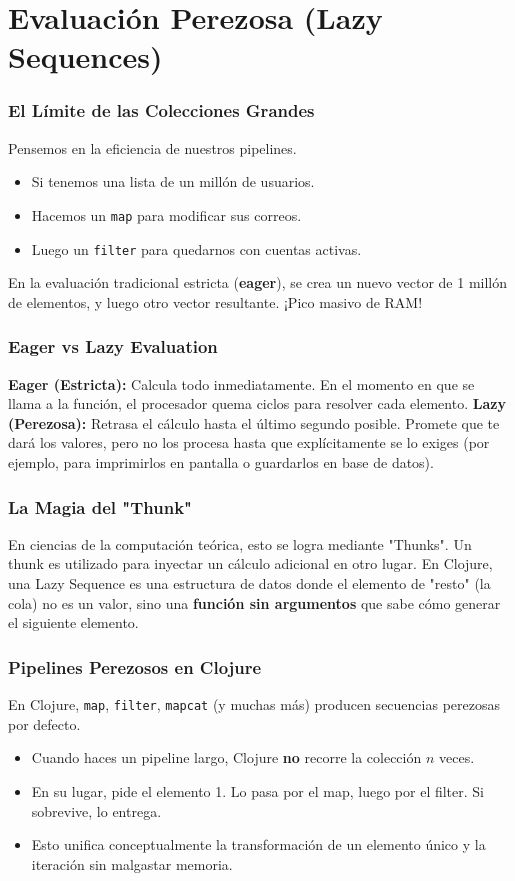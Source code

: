 \documentclass{beamer}
\begin{document}
\section{Evaluación Perezosa (Lazy Sequences)}

\begin{frame}
    \frametitle{El Límite de las Colecciones Grandes}
    Pensemos en la eficiencia de nuestros pipelines.
    \begin{itemize}
        \item Si tenemos una lista de un millón de usuarios.
        \item Hacemos un \texttt{map} para modificar sus correos.
        \item Luego un \texttt{filter} para quedarnos con cuentas activas.
    \end{itemize}
    En la evaluación tradicional estricta (\textbf{eager}), se crea un nuevo vector de 1 millón de elementos, y luego otro vector resultante. ¡Pico masivo de RAM!
\end{frame}

\begin{frame}
    \frametitle{Eager vs Lazy Evaluation}
    \textbf{Eager (Estricta):} Calcula todo inmediatamente. En el momento en que se llama a la función, el procesador quema ciclos para resolver cada elemento.
    \vspace{0.5cm}
    \textbf{Lazy (Perezosa):} Retrasa el cálculo hasta el último segundo posible. Promete que te dará los valores, pero no los procesa hasta que explícitamente se lo exiges (por ejemplo, para imprimirlos en pantalla o guardarlos en base de datos).
\end{frame}

\begin{frame}
    \frametitle{La Magia del "Thunk"}
    En ciencias de la computación teórica, esto se logra mediante "Thunks".
    Un thunk es utilizado para inyectar un cálculo adicional en otro lugar. En Clojure, una Lazy Sequence es una estructura de datos donde el elemento de "resto" (la cola) no es un valor, sino una \textbf{función sin argumentos} que sabe cómo generar el siguiente elemento.
\end{frame}

\begin{frame}
    \frametitle{Pipelines Perezosos en Clojure}
    En Clojure, \texttt{map}, \texttt{filter}, \texttt{mapcat} (y muchas más) producen secuencias perezosas por defecto.
    \begin{itemize}
        \item Cuando haces un pipeline largo, Clojure \textbf{no} recorre la colección $n$ veces.
        \item En su lugar, pide el elemento 1. Lo pasa por el map, luego por el filter. Si sobrevive, lo entrega.
        \item Esto unifica conceptualmente la transformación de un elemento único y la iteración sin malgastar memoria.
    \end{itemize}
\end{frame}
\end{document}
